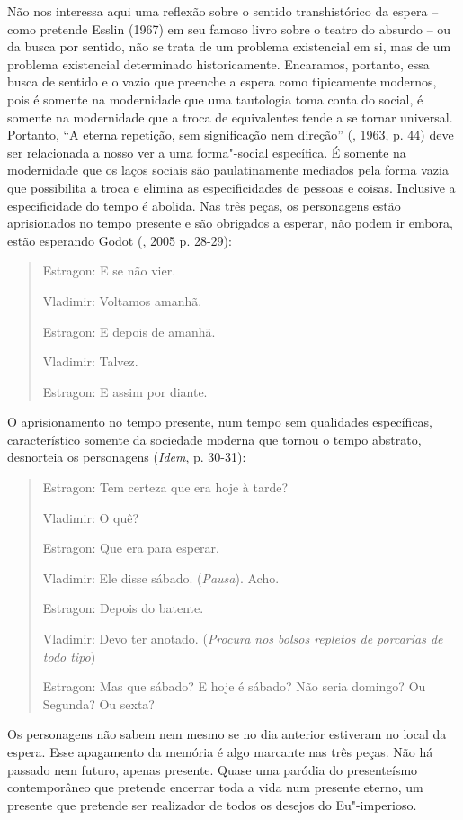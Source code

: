 {Não nos interessa aqui uma reflexão sobre o sentido transhistórico da
espera -- como pretende Esslin (1967) em seu famoso livro sobre o teatro
do absurdo -- ou da busca por sentido, não se trata de um problema
existencial em si, mas de um problema existencial determinado
historicamente. Encaramos, portanto, essa busca de sentido e o vazio que
preenche a espera como tipicamente modernos, pois é somente na
modernidade que uma tautologia toma conta do social, é somente na
modernidade que a troca de equivalentes tende a se tornar universal.
Portanto, ``A eterna repetição, sem significação nem direção'' (,
1963, p. 44) deve ser relacionada a nosso ver a uma forma"-social
específica. É somente na modernidade que os laços sociais são
paulatinamente mediados pela forma vazia que possibilita a troca e
elimina as especificidades de pessoas e coisas. Inclusive a
especificidade do tempo é abolida. Nas três peças, os personagens estão
aprisionados no tempo presente e são obrigados a esperar, não podem ir
embora, estão esperando Godot (, 2005 p. 28-29):

\begin{quote}
\forceindent{}Estragon: E se não vier.

Vladimir: Voltamos amanhã.

Estragon: E depois de amanhã.

Vladimir: Talvez.

Estragon: E assim por diante.
\end{quote}

O aprisionamento no tempo presente, num tempo sem qualidades
específicas, característico somente da sociedade moderna que tornou o
tempo abstrato, desnorteia os personagens (\emph{Idem}, p. 30-31):

\begin{quote}
\forceindent{}Estragon: Tem certeza que era hoje à tarde?

Vladimir: O quê?

Estragon: Que era para esperar.

Vladimir: Ele disse sábado. (\emph{Pausa}). Acho.

Estragon: Depois do batente.

Vladimir: Devo ter anotado. (\emph{Procura nos bolsos repletos de
porcarias de todo tipo})

Estragon: Mas que sábado? E hoje é sábado? Não seria domingo? Ou
Segunda? Ou sexta?
\end{quote}

Os personagens não sabem nem mesmo se no dia anterior estiveram no local
da espera. Esse apagamento da memória é algo marcante nas três peças.
Não há passado nem futuro, apenas presente. Quase uma paródia do
presenteísmo contemporâneo que pretende encerrar toda a vida num
presente eterno, um presente que pretende ser realizador de todos os
desejos do Eu"-imperioso.

}
